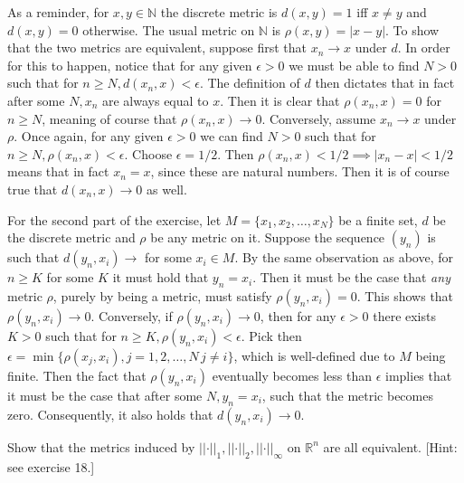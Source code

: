 \begin{solution}
    
    As a reminder, for $x, y \in \mathbb{N}$ the discrete metric is $d(x, y) = 1$ iff $x \neq y$ and $d(x, y) = 0$ otherwise.
    The usual metric on $\mathbb{N}$ is $\rho(x, y) = \lvert x - y \rvert$. 
    To show that the two metrics are equivalent, suppose first that $x_n \rightarrow x$ under $d$.
    In order for this to happen, notice that for any given $\epsilon > 0$ we must be able to find $N > 0$ such that for $n \geq N, d(x_n, x) < \epsilon$.
    The definition of $d$ then dictates that in fact after some $N, x_n$ are always equal to $x$.
    Then it is clear that $\rho(x_n, x) = 0$ for $n \geq N$, meaning of course that $\rho(x_n, x) \rightarrow 0$.
    Conversely, assume $x_n \rightarrow x$ under $\rho$.
    Once again, for any given $\epsilon > 0$ we can find $N > 0$ such that for $n \geq N, \rho(x_n, x) < \epsilon$.
    Choose $\epsilon = 1/2$.
    Then $\rho(x_n, x) < 1/2 \implies \lvert x_n - x \rvert < 1/2$ means that in fact $x_n = x$, since these are natural numbers.
    Then it is of course true that $d(x_n, x) \rightarrow 0$ as well.

    For the second part of the exercise, let $M = \{x_1, x_2, \ldots, x_N\}$ be a finite set, $d$ be the discrete metric and $\rho$ be any metric on it.
    Suppose the sequence $(y_n)$ is such that 
    $d(y_n, x_i) \rightarrow$ for some $x_i \in M$.
    By the same observation as above, for $n \geq K$ for some $K$ it must hold that $y_n = x_i$.
    Then it must be the case that \textit{any} metric $\rho$, purely by being a metric, must satisfy $\rho(y_n, x_i) = 0$.
    This shows that $\rho(y_n, x_i) \rightarrow 0$.
    Conversely, if $\rho(y_n, x_i) \rightarrow 0$, then for any $\epsilon > 0$ there exists $K > 0$ such that for $n \geq K, \rho(y_n, x_i) < \epsilon$.
    Pick then $\epsilon = \min\{\rho(x_j, x_i), j = 1, 2, \ldots, N\, j \neq i \}$, which is well-defined due to $M$ being finite.
    Then the fact that $\rho(y_n, x_i)$ eventually becomes less than $\epsilon$ implies that it must be the case that after some $N, y_n = x_i$, such that the metric becomes zero.
    Consequently, it also holds that $d(y_n, x_i)\rightarrow 0$.

\end{solution}

\begin{exercise}{44}
    Show that the metrics induced by $\lvert \lvert \cdot \rvert \rvert_1, \lvert \lvert \cdot \rvert \rvert_2, \lvert \lvert \cdot \rvert \rvert_{\infty}$ on $\mathbb{R}^n$ are all equivalent.
    [Hint: see exercise 18.]
\end{exercise}

